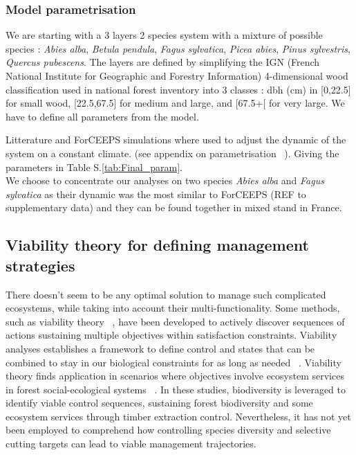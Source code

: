 \documentclass{article}
\begin{document}
\subsubsection{Model parametrisation}

We are starting with a 3 layers 2 species system with a mixture of possible species : \textit{Abies alba}, \textit{Betula pendula}, \textit{Fagus sylvatica}, \textit{Picea abies}, \textit{Pinus sylvestris}, \textit{Quercus pubescens}. The layers are defined by simplifying the IGN (French National Institute for Geographic and Forestry Information) 4-dimensional wood classification used in national forest inventory into 3 classes : dbh (cm) in [0,22.5] for small wood, [22.5,67.5] for medium and large, and [67.5+[ for very large. We have to define all parameters from the model.

Litterature and ForCEEPS simulations where used to adjust the dynamic of the system on a constant climate. (see appendix on parametrisation ~\autocite{bugmannEcologyMountainousForests1994,morinForestSuccessionGap2021}). Giving the parameters in Table S.\ref{tab:Final_param}.\\
We choose to concentrate our analyses on two species \textit{Abies alba} and \textit{Fagus sylvatica} as their dynamic was the most similar to ForCEEPS (REF to supplementary data) and they can be found together in mixed stand in France.

\subsection{Viability theory for defining management strategies}

There doesn't seem to be any optimal solution to manage such complicated ecosystems, while taking into account their multi-functionality. Some methods, such as viability theory ~\autocite{aubinStochasticViabilityInvariance1990}, have been developed to actively discover sequences of actions sustaining multiple objectives within satisfaction constraints. Viability analyses establishes a framework to define control and states that can be combined to stay in our biological constraints for as long as needed ~\autocite{rougeExtendingViabilityTheory2013}.
Viability theory finds application in scenarios where objectives involve ecosystem services in forest social-ecological systems ~\autocite{mathiasUsingViabilityTheory2015}. In these studies, biodiversity is leveraged to identify viable control sequences, sustaining forest biodiversity and some ecosystem services through timber extraction control.
Nevertheless, it has not yet been employed to comprehend how controlling species diversity and selective cutting targets can lead to viable management trajectories.
\end{document}
